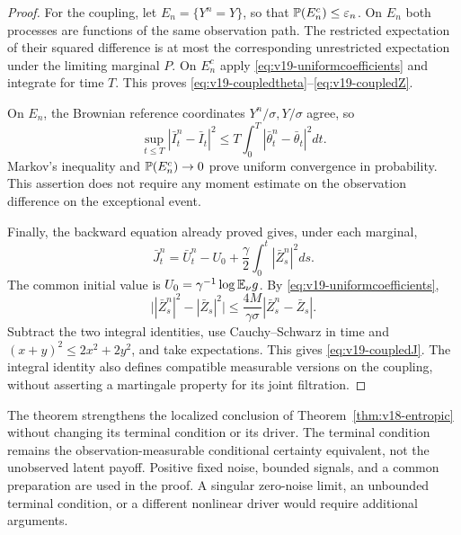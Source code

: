 \begin{proof}
For the coupling, let $E_n=\{Y^n=Y\}$, so that
$\mathbb P(E_n^c)\le\varepsilon_n$. On $E_n$ both processes are functions of
the same observation path. The restricted expectation of their squared
difference is at most the corresponding unrestricted expectation under the
limiting marginal $P$. On $E_n^c$ apply
\eqref{eq:v19-uniformcoefficients} and integrate for time $T$. This proves
\eqref{eq:v19-coupledtheta}--\eqref{eq:v19-coupledZ}.

On $E_n$, the Brownian reference coordinates $Y^n/\sigma,Y/\sigma$
agree, so
\[
 \sup_{t\le T}|\bar I_t^n-\bar I_t|^2
       \le T\int_0^T|\bar\theta_t^n-\bar\theta_t|^2dt.
\]
Markov's inequality and $\mathbb P(E_n^c)\to0$ prove uniform convergence in
probability. This assertion does not require any moment estimate on the
observation difference on the exceptional event.

Finally, the backward equation already proved gives, under each marginal,
\[
 \bar J_t^n=\bar U_t^n-U_0
                   +\frac\gamma2\int_0^t|\bar Z_s^n|^2ds.
\]
The common initial value is $U_0=\gamma^{-1}\log\mathbb E_\nu g$.
By \eqref{eq:v19-uniformcoefficients},
\[
 \big||\bar Z_s^n|^2-|\bar Z_s|^2\big|
             \le\frac{4M}{\gamma\sigma}|\bar Z_s^n-\bar Z_s|.
\]
Subtract the two integral identities, use Cauchy--Schwarz in time and
$(x+y)^2\le2x^2+2y^2$, and take expectations. This gives
\eqref{eq:v19-coupledJ}. The integral identity also defines compatible
measurable versions on the coupling, without asserting a martingale
property for its joint filtration.
\end{proof}

The theorem strengthens the localized conclusion of
Theorem~\ref{thm:v18-entropic} without changing its terminal condition or
its driver. The terminal condition remains the observation-measurable
conditional certainty equivalent, not the unobserved latent payoff.
Positive fixed noise, bounded signals, and a common preparation are used
in the proof. A singular zero-noise limit, an unbounded terminal condition,
or a different nonlinear driver would require additional arguments.
